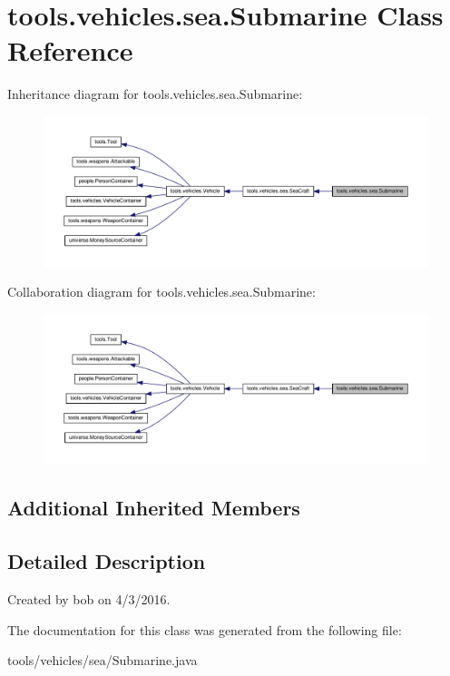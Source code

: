 \hypertarget{classtools_1_1vehicles_1_1sea_1_1_submarine}{}\section{tools.\+vehicles.\+sea.\+Submarine Class Reference}
\label{classtools_1_1vehicles_1_1sea_1_1_submarine}


Inheritance diagram for tools.\+vehicles.\+sea.\+Submarine\+:\nopagebreak
\begin{figure}[H]
\begin{center}
\leavevmode
\includegraphics[width=350pt]{classtools_1_1vehicles_1_1sea_1_1_submarine__inherit__graph}
\end{center}
\end{figure}


Collaboration diagram for tools.\+vehicles.\+sea.\+Submarine\+:\nopagebreak
\begin{figure}[H]
\begin{center}
\leavevmode
\includegraphics[width=350pt]{classtools_1_1vehicles_1_1sea_1_1_submarine__coll__graph}
\end{center}
\end{figure}
\subsection*{Additional Inherited Members}


\subsection{Detailed Description}
Created by bob on 4/3/2016. 

The documentation for this class was generated from the following file\+:\begin{DoxyCompactItemize}
\item 
tools/vehicles/sea/Submarine.\+java\end{DoxyCompactItemize}
